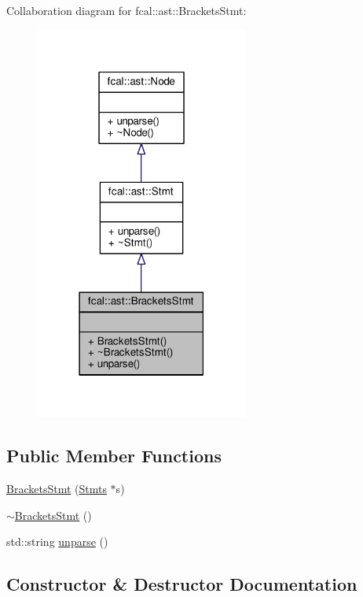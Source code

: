 Collaboration diagram for fcal\+:\+:ast\+:\+:Brackets\+Stmt\+:
\nopagebreak
\begin{figure}[H]
\begin{center}
\leavevmode
\includegraphics[width=198pt]{classfcal_1_1ast_1_1BracketsStmt__coll__graph}
\end{center}
\end{figure}
\subsection*{Public Member Functions}
\begin{DoxyCompactItemize}
\item 
\hyperlink{classfcal_1_1ast_1_1BracketsStmt_acd73a437dde409574c433221b3e16b62}{Brackets\+Stmt} (\hyperlink{classfcal_1_1ast_1_1Stmts}{Stmts} $\ast$s)
\item 
\hyperlink{classfcal_1_1ast_1_1BracketsStmt_acc226fdb915d61b35e18505587333e63}{$\sim$\+Brackets\+Stmt} ()
\item 
std\+::string \hyperlink{classfcal_1_1ast_1_1BracketsStmt_a1779d8a9115bd9ef4fb6835e45509573}{unparse} ()
\end{DoxyCompactItemize}


\subsection{Constructor \& Destructor Documentation}
